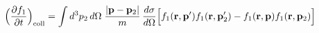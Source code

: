 \documentclass[preview]{standalone}
\begin{document}
\begin{align*}
\special{dvisvgm:raw <g id='unique000'>}\Big(\pdv{f_1}{t}\Big)_{\rm coll}=\int d^3p_2\,d\Omega\;\frac{|\va p-\va p_2|}{m}\,\frac{d\sigma}{d\Omega}\Big[f_1(\va r,\va p')f_1(\va r,\va p_2')-f_1(\va r,\va p)f_1(\va r,\va p_2)\Big]\special{dvisvgm:raw </g>}
\end{align*}
\end{document}
